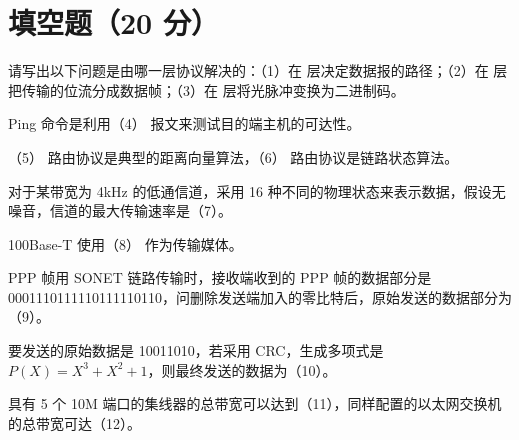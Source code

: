 \noindent{}\par
{}
\section{填空题（20 分）}
\begin{question}[index=1]
请写出以下问题是由哪一层协议解决的：（1）在 \underline{\hspace{4em}} 层决定数据报的路径；（2）在 \underline{\hspace{4em}} 层把传输的位流分成数据帧；（3）在 \underline{\hspace{4em}} 层将光脉冲变换为二进制码。
\end{question}
\begin{question}[index=2]
Ping 命令是利用（4）\underline{\hspace{5em}} 报文来测试目的端主机的可达性。
\end{question}
\begin{question}[index=3]
（5）\underline{\hspace{5em}} 路由协议是典型的距离向量算法，（6）\underline{\hspace{5em}} 路由协议是链路状态算法。
\end{question}
\begin{question}[index=4]
对于某带宽为 4kHz 的低通信道，采用 16 种不同的物理状态来表示数据，假设无噪音，信道的最大传输速率是（7）\underline{\hspace{6em}}。
\end{question}
\begin{question}[index=5]
100Base-T 使用（8）\underline{\hspace{6em}} 作为传输媒体。
\end{question}
\begin{question}[index=6]
PPP 帧用 SONET 链路传输时，接收端收到的 PPP 帧的数据部分是 0001110111110111110110，问删除发送端加入的零比特后，原始发送的数据部分为（9）\underline{\hspace{8em}}。
\end{question}
\begin{question}[index=7]
要发送的原始数据是 10011010，若采用 CRC，生成多项式是 $P(X)=X^3+X^2+1$，则最终发送的数据为（10）\underline{\hspace{8em}}。
\end{question}
\begin{question}[index=8]
具有 5 个 10M 端口的集线器的总带宽可以达到（11）\underline{\hspace{5em}}，同样配置的以太网交换机的总带宽可达（12）\underline{\hspace{5em}}。
\end{question}
